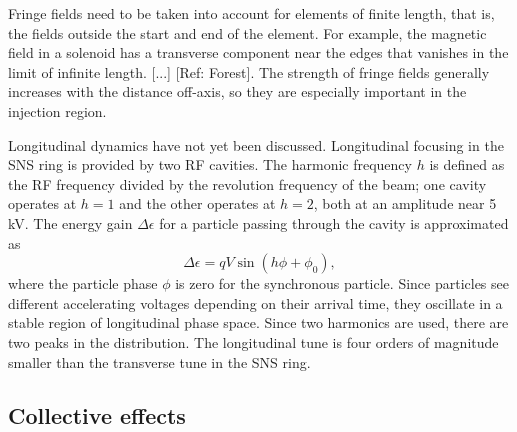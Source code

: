 Fringe fields need to be taken into account for elements of finite length, that is, the fields outside the start and end of the element. For example, the magnetic field in a solenoid has a transverse component near the edges that vanishes in the limit of infinite length. [...] [Ref: Forest]. The strength of fringe fields generally increases with the distance off-axis, so they are especially important in the injection region.

Longitudinal dynamics have not yet been discussed. Longitudinal focusing in the SNS ring is provided by two RF cavities. The harmonic frequency $h$ is defined as the RF frequency divided by the revolution frequency of the beam; one cavity operates at $h = 1$ and the other operates at $h = 2$, both at an amplitude near 5 kV. The energy gain $\Delta \epsilon$ for a particle passing through the cavity is approximated as  
%
\begin{equation}\label{eq:RF}
    \Delta \epsilon = q V \sin(h \phi + \phi_0),
\end{equation}
%
where the particle phase $\phi$ is zero for the synchronous particle. Since particles see different accelerating voltages depending on their arrival time, they oscillate in a stable region of longitudinal phase space. Since two harmonics are used, there are two peaks in the distribution. The longitudinal tune is four orders of magnitude smaller than the transverse tune in the SNS ring. 



\subsection{Collective effects}

